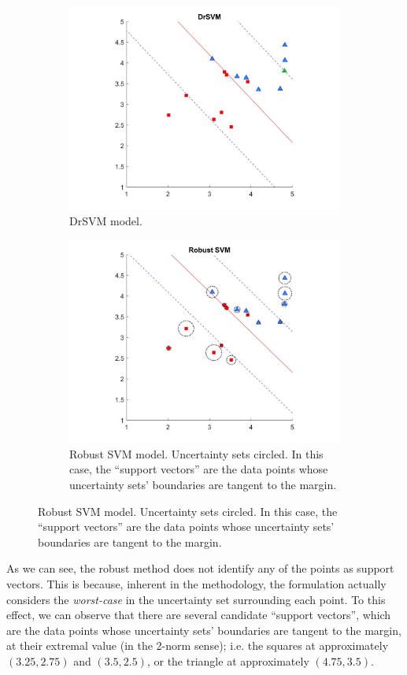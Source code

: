 \documentclass[11pt]{article}
\begin{document}
\begin{figure}[hbt!]
\begin{subfigure}{.5\textwidth}
		\includegraphics[width=\linewidth]{dr}
		\caption{DrSVM model.}
	\end{subfigure}
	\begin{subfigure}{.5\textwidth}
		\centering
		\captionsetup{font=footnotesize}
		\includegraphics[width=\linewidth]{robust}
		\caption{Robust SVM model. Uncertainty sets circled. In this case, the ``support vectors'' are the data points whose uncertainty sets' boundaries are tangent to the margin.}
	\end{subfigure}
\end{figure}

As we can see, the robust method does not identify any of the points as support vectors. This is because, inherent in the methodology, the formulation actually considers the \emph{worst-case} in the uncertainty set surrounding each point. To this effect, we can observe that there are several candidate ``support vectors'', which are the data points whose uncertainty sets' boundaries are tangent to the margin, at their extremal value (in the 2-norm sense); i.e. the squares at approximately $(3.25, 2.75)$ and $(3.5,2.5)$, or the triangle at approximately $(4.75,3.5)$. 
\end{document}
